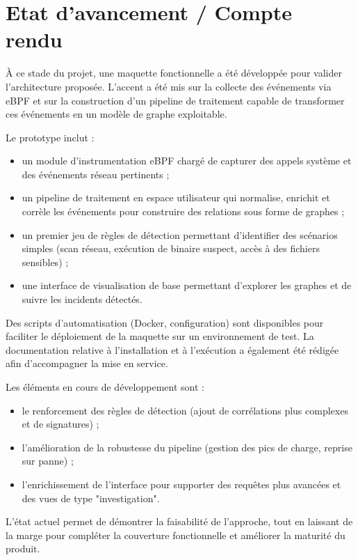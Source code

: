 \documentclass[a4paper,12pt]{article}
\begin{document}
\section{Etat d'avancement / Compte rendu}

À ce stade du projet, une maquette fonctionnelle a été développée pour valider l'architecture proposée. L'accent a été mis sur la collecte des événements via eBPF et sur la construction d'un pipeline de traitement capable de transformer ces événements en un modèle de graphe exploitable.

Le prototype inclut :

\begin{itemize}
  \item un module d'instrumentation eBPF chargé de capturer des appels système et des événements réseau pertinents ;
  \item un pipeline de traitement en espace utilisateur qui normalise, enrichit et corrèle les événements pour construire des relations sous forme de graphes ;
  \item un premier jeu de règles de détection permettant d'identifier des scénarios simples (scan réseau, exécution de binaire suspect, accès à des fichiers sensibles) ;
  \item une interface de visualisation de base permettant d'explorer les graphes et de suivre les incidents détectés.
\end{itemize}

Des scripts d'automatisation (Docker, configuration) sont disponibles pour faciliter le déploiement de la maquette sur un environnement de test. La documentation relative à l'installation et à l'exécution a également été rédigée afin d'accompagner la mise en service.

Les éléments en cours de développement sont :

\begin{itemize}
  \item le renforcement des règles de détection (ajout de corrélations plus complexes et de signatures) ;
  \item l'amélioration de la robustesse du pipeline (gestion des pics de charge, reprise sur panne) ;
  \item l'enrichissement de l'interface pour supporter des requêtes plus avancées et des vues de type "investigation".
\end{itemize}

L'état actuel permet de démontrer la faisabilité de l'approche, tout en laissant de la marge pour compléter la couverture fonctionnelle et améliorer la maturité du produit.
\end{document}
